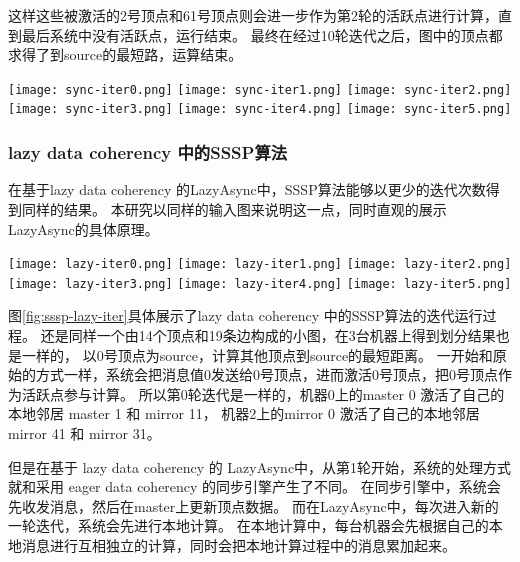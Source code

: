 这样这些被激活的2号顶点和61号顶点则会进一步作为第2轮的活跃点进行计算，直到最后系统中没有活跃点，运行结束。
最终在经过10轮迭代之后，图中的顶点都求得了到source的最短路，运算结束。


\begin{center}
  \texttt{[image: sync-iter0.png]}
  \texttt{[image: sync-iter1.png]}
  \texttt{[image: sync-iter2.png]}    
  \texttt{[image: sync-iter3.png]}    
  \texttt{[image: sync-iter4.png]}    
  \texttt{[image: sync-iter5.png]}    

  \label{fig:sssp-sync-iter}
\end{center}  

\subsubsection{lazy data coherency 中的SSSP算法}

在基于lazy data coherency 的LazyAsync中，SSSP算法能够以更少的迭代次数得到同样的结果。
本研究以同样的输入图来说明这一点，同时直观的展示LazyAsync的具体原理。

\begin{center}
  \texttt{[image: lazy-iter0.png]}
  \texttt{[image: lazy-iter1.png]}
  \texttt{[image: lazy-iter2.png]}    
  \texttt{[image: lazy-iter3.png]}    
  \texttt{[image: lazy-iter4.png]}    
  \texttt{[image: lazy-iter5.png]}
  \label{fig:sssp-lazy-iter}
\end{center}  


图\ref{fig:sssp-lazy-iter}具体展示了lazy data coherency 中的SSSP算法的迭代运行过程。
还是同样一个由14个顶点和19条边构成的小图，在3台机器上得到划分结果也是一样的，
以0号顶点为source，计算其他顶点到source的最短距离。
一开始和原始的方式一样，系统会把消息值0发送给0号顶点，进而激活0号顶点，把0号顶点作为活跃点参与计算。  
所以第0轮迭代是一样的，机器0上的master 0 激活了自己的本地邻居 master 1 和 mirror 11，
机器2上的mirror 0 激活了自己的本地邻居mirror 41 和 mirror 31。

但是在基于 lazy data coherency 的 LazyAsync中，从第1轮开始，系统的处理方式就和采用 eager data coherency 的同步引擎产生了不同。
在同步引擎中，系统会先收发消息，然后在master上更新顶点数据。
而在LazyAsync中，每次进入新的一轮迭代，系统会先进行本地计算。
在本地计算中，每台机器会先根据自己的本地消息进行互相独立的计算，同时会把本地计算过程中的消息累加起来。

